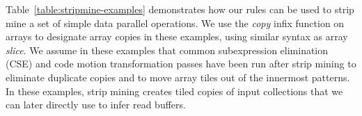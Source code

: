 



Table~\ref{table:stripmine-examples} demonstrates how our rules can be used to strip mine a set of simple data parallel operations.
We use the \emph{copy} infix function on arrays to designate array copies in these examples, using similar syntax as array \emph{slice}.
We assume in these examples that common subexpression elimination (CSE) and code motion transformation passes have been run after strip mining to eliminate duplicate copies and to
move array tiles out of the innermost patterns. In these examples, strip mining creates tiled copies of input collections that
we can later directly use to infer read buffers.




